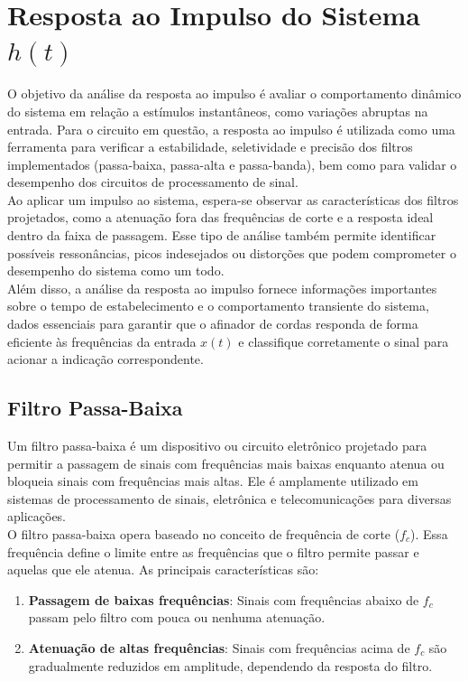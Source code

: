 \documentclass[a4paper, 12pt]{article}
\begin{document}


\section{Resposta ao Impulso do Sistema $h(t)$}

O objetivo da análise da resposta ao impulso é avaliar o comportamento dinâmico do sistema em relação a estímulos instantâneos, como variações abruptas na entrada. Para o circuito em questão, a resposta ao impulso é utilizada como uma ferramenta para verificar a estabilidade, seletividade e precisão dos filtros implementados (passa-baixa, passa-alta e passa-banda), bem como para validar o desempenho dos circuitos de processamento de sinal.\\

Ao aplicar um impulso ao sistema, espera-se observar as características dos filtros projetados, como a atenuação fora das frequências de corte e a resposta ideal dentro da faixa de passagem. Esse tipo de análise também permite identificar possíveis ressonâncias, picos indesejados ou distorções que podem comprometer o desempenho do sistema como um todo.\\

Além disso, a análise da resposta ao impulso fornece informações importantes sobre o tempo de estabelecimento e o comportamento transiente do sistema, dados essenciais para garantir que o afinador de cordas responda de forma eficiente às frequências da entrada $x(t)$ e classifique corretamente o sinal para acionar a indicação correspondente.


\subsection{Filtro Passa-Baixa}

Um filtro passa-baixa é um dispositivo ou circuito eletrônico projetado para permitir a passagem de sinais com frequências mais baixas enquanto atenua ou bloqueia sinais com frequências mais altas. Ele é amplamente utilizado em sistemas de processamento de sinais, eletrônica e telecomunicações para diversas aplicações.\\

O filtro passa-baixa opera baseado no conceito de frequência de corte ($f_c$). Essa frequência define o limite entre as frequências que o filtro permite passar e aquelas que ele atenua. As principais características são:

\begin{enumerate}
    \item \textbf{Passagem de baixas frequências}: Sinais com frequências abaixo de $f_c$ passam pelo filtro com pouca ou nenhuma atenuação.
    \item \textbf{Atenuação de altas frequências}: Sinais com frequências acima de $f_c$ são gradualmente reduzidos em amplitude, dependendo da resposta do filtro.
\end{enumerate}
\end{document}
